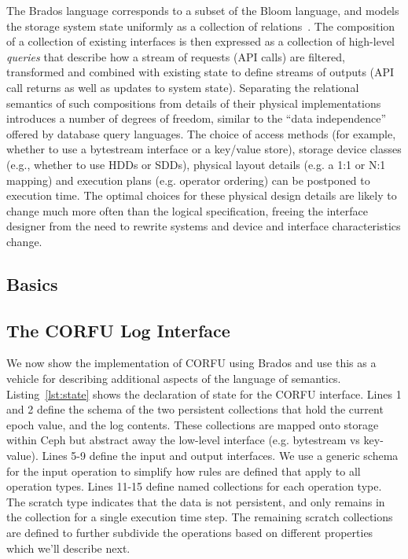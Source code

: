 \documentclass[10pt,twocolumn]{article}
\begin{document}
The Brados language corresponds to a subset of the Bloom language, and models the
storage system state uniformly as a collection of
relations~\cite{alvaro:cidr11}. The composition of a collection of existing
interfaces is then expressed as a collection of high-level \emph{queries} that
describe how a stream of requests (API calls) are filtered, transformed and
combined with existing state to define streams of outputs (API call returns as
well as updates to system state).  Separating the relational semantics of such
compositions from details of their physical implementations introduces a
number of degrees of freedom, similar to the ``data independence'' offered by
database query languages.  The choice of access methods (for example, whether
to use a bytestream interface or a key/value store), storage device
classes (e.g., whether to use HDDs or SDDs), physical layout details (e.g. a
1:1 or N:1 mapping) and execution plans (e.g. operator ordering) can be
postponed to execution time.  The optimal choices for these physical design
details are likely to change much more often than the logical specification,
freeing the interface designer from the need to rewrite systems and device and
interface characteristics change.

\subsection{Basics}

\subsection{The CORFU Log Interface}

We now show the implementation of CORFU using Brados and use this as a vehicle
for describing additional aspects of the language of semantics.
Listing~\ref{lst:state} shows the declaration of state for the CORFU
interface. Lines 1 and 2 define the schema of the two persistent collections
that hold the current epoch value, and the log contents. These collections are
mapped onto storage within Ceph but abstract away the low-level interface
(e.g. bytestream vs key-value). Lines 5-9 define the input and output
interfaces. We use a generic schema for the input operation to simplify
how rules are defined that apply to all operation types. Lines 11-15 define
named collections for each operation type. The scratch type indicates that the
data is not persistent, and only remains in the collection for a single 
execution time step. The remaining scratch collections are defined to further
subdivide the operations based on different properties which we'll describe next.
\end{document}
